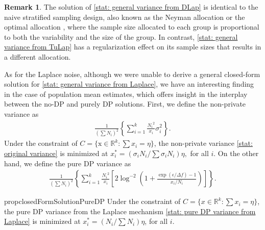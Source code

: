 \documentclass{article}
\theoremstyle{definition}
\newtheorem{remark}[theorem]{Remark}
\begin{document}
\begin{remark}
The solution of \eqref{stat: general variance from DLap} is identical to the naive stratified sampling design, also known as the Neyman allocation \citep{neyman1934two} or the optimal allocation \citep{kempf2004encyclopedia}, where the sample size allocated to each group is proportional to both the variability and the size of the group. In contrast, \eqref{stat: general variance from TuLap} has a regularization effect on its sample sizes that results in a different allocation.
\end{remark}
    
As for the Laplace noise, although we were unable to derive a general closed-form solution for \eqref{stat: general variance from Laplace}, we have an interesting finding in the case of population mean estimates, which offers insight in the interplay between the no-DP and purely DP solutions. First, we define the non-private variance as 
\begin{align} \label{stat: original variance}
    \frac{1}{(\sum N_i)^2} \left\{ \sum_{i=1}^k \frac{{N_i}^2}{x_i} \sigma_i^2 \right\}.
\end{align}
Under the constraint of  $C = \{ \mathrm{x} \in \mathbb{R}^k : \sum x_i = \eta\}$, the non-private variance \eqref{stat: original variance} is minimized at 
        $x_i^* = (\sigma_i N_i/\sum \sigma_i N_i) \eta,$ 
for all $i$. On the other hand, we define the pure DP variance as 
\begin{align} \label{stat: pure DP variance from Laplace}
    \frac{1}{(\sum N_i)^2} \left\{ \sum_{i=1}^k \frac{{N_i}^2}{x_i} \left[ 2 \log^{-2} \left( 1+ \frac{\exp{(\epsilon / \Delta f)}-1}{x_i/N_i} \right) \right] \right\}.
\end{align}

\begin{restatable}{prop}{closedFormSolutionPureDP} \label{prop: solution of pure DP variance from Laplace}
Under the constraint of  $C = \{ x \in \mathbb{R}^k : \sum x_i = \eta\}$, the pure DP variance from the Laplace mechanism \eqref{stat: pure DP variance from Laplace} is minimized at 
        $x_i^* = (N_i/\sum N_i) \eta$, 
for all $i$.
\end{restatable}
\end{document}
